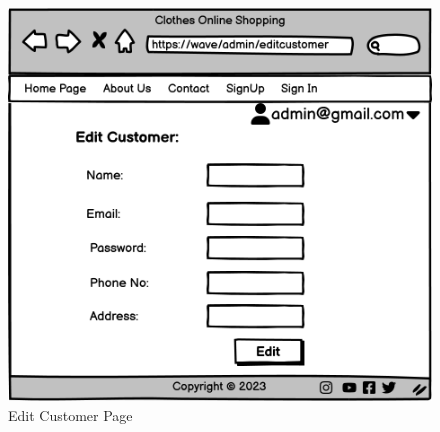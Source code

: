 \bigskip
\bigskip
\bigskip
\begin{figure}[h]
\centerline{\includegraphics[scale=1.]{images/Edit Customer.png}}
\caption{Edit Customer Page}
\label{fig}
\end{figure}